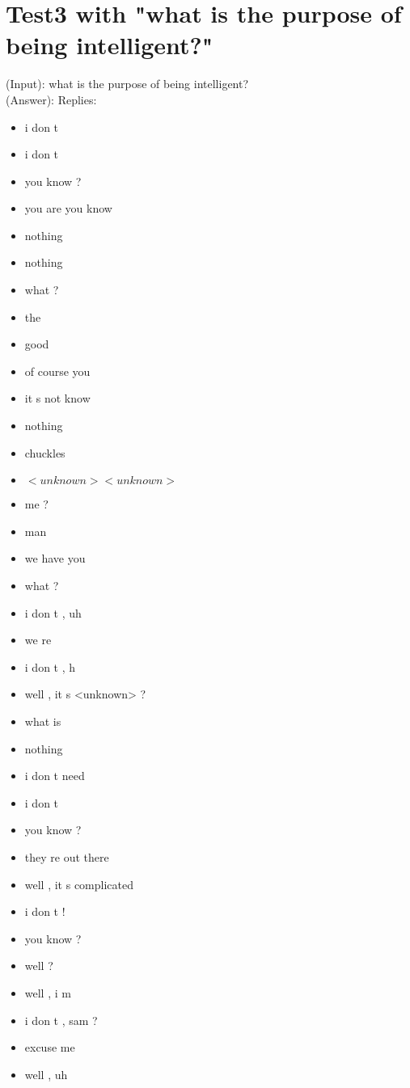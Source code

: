 \section{Test3 with "what is the purpose of being intelligent?"}
\label{apendix:result3:Beam-search-200:OpenSubtitle}
(Input): what is the purpose of being intelligent?\\
(Answer): Replies:
\begin{multicols}{2}
	\begin{itemize}
		\item i don t
		\item i don t
		\item you know ?
		\item you are you know
		\item nothing
		\item nothing
		\item what ?
		\item the
		\item good
		\item of course you
		\item it s not know
		\item nothing
		\item chuckles
		\item $<unknown> <unknown>$
		\item me ?
		\item man
		\item we have you
		\item what ?
		\item i don t , uh
		\item we re
		\item i don t , h
		\item well , it s <unknown> ?
		\item what is
		\item nothing
		\item i don t need
		\item i don t
		\item you know ?
		\item they re out there
		\item well , it s complicated
		\item i don t !
		\item you know ?
		\item well ?
		\item well , i m
		\item i don t , sam ?
		\item excuse me
		\item well , uh

\end{itemize}
\end{multicols}
